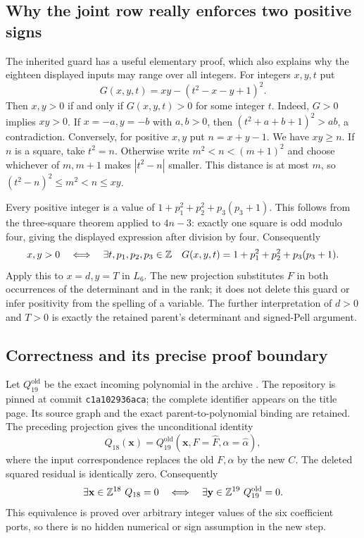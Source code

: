 \subsection{Why the joint row really enforces two positive signs}

The inherited guard has a useful elementary proof, which also explains why
the eighteen displayed inputs may range over all integers.  For integers
$x,y,t$ put
\[
 G(x,y,t)=xy-(t^2-x-y+1)^2.
\]
Then $x,y>0$ if and only if $G(x,y,t)>0$ for some integer $t$.
Indeed, $G>0$ implies $xy>0$.  If $x=-a,y=-b$ with $a,b>0$, then
$(t^2+a+b+1)^2>ab$, a contradiction.  Conversely, for positive $x,y$ put
$n=x+y-1$.  We have $xy\ge n$.  If $n$ is a square, take $t^2=n$.
Otherwise write $m^2<n<(m+1)^2$ and choose whichever of $m,m+1$ makes
$|t^2-n|$ smaller.  This distance is at most $m$, so
$(t^2-n)^2\le m^2<n\le xy$.

Every positive integer is a value of
$1+p_1^2+p_2^2+p_3(p_3+1)$.  This follows from the three-square theorem
applied to $4n-3$: exactly one square is odd modulo four, giving the
displayed expression after division by four.  Consequently
\[
 x,y>0\quad\Longleftrightarrow\quad
 \exists t,p_1,p_2,p_3\in\mathbb Z\quad
 G(x,y,t)=1+p_1^2+p_2^2+p_3(p_3+1).
\]
Apply this to $x=d,y=T$ in $L_6$.  The new projection substitutes $F$
in both occurrences of the determinant and in the rank; it does not
delete this guard or infer positivity from the spelling of a variable.
The further interpretation of $d>0$ and $T>0$ is exactly the retained
parent's determinant and signed-Pell argument.

\subsection{Correctness and its precise proof boundary}
\label{int-correctness}

Let $Q_{19}^{\mathrm{old}}$ be the exact incoming polynomial
 in the archive
.
The repository is pinned at commit \texttt{c1a102936aca};
the complete identifier appears on the title page.
Its source graph and the exact parent-to-polynomial binding are retained.
The preceding projection gives the unconditional identity
\[
 Q_{18}(\mathbf x)=
 Q_{19}^{\mathrm{old}}(\mathbf x,
       F=\widehat F,\alpha=\widehat\alpha),
\]
where the input correspondence replaces the old $F,\alpha$ by the new
$C$.  The deleted squared residual is identically zero.
Consequently
\begin{equation}
 \exists\mathbf x\in\Z^{18}\ Q_{18}=0
 \quad\Longleftrightarrow\quad
 \exists\mathbf y\in\Z^{19}\ Q_{19}^{\mathrm{old}}=0.       \label{int-bijection}
\end{equation}
This equivalence is proved over arbitrary integer values of the six
coefficient ports, so there is no hidden numerical or sign assumption
in the new step.

